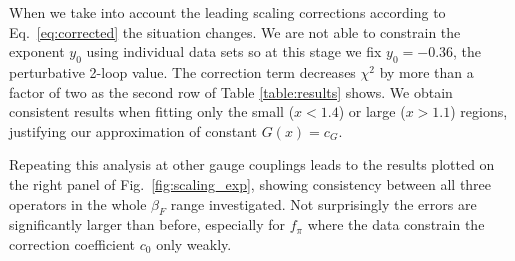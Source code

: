 \documentclass[aps,prl,twocolumn,]{revtex4-1}  %
\newcommand{\eq}[1]{Eq.~\ref{#1}}
\newcommand{\fig}[1]{Fig.~\ref{#1}}
\begin{document}
When we take into account the leading scaling corrections according to \eq{eq:corrected} the situation changes. We are not able to constrain  the exponent $y_0$ using individual data sets so at this stage we fix $y_0=-0.36$, the perturbative  2-loop value. The correction term decreases  $\chi^2$ by more than a factor of two    as the second row of Table \ref{table:results} shows. We obtain consistent results when fitting only the small ($x<1.4$) or large ($x>1.1$) regions, justifying our approximation of constant $G(x) = c_G$. 

Repeating this analysis at other gauge couplings
leads to the results plotted on the right panel of \fig{fig:scaling_exp}, showing consistency between all three operators in the whole $\beta_F$ range investigated.
Not surprisingly the errors are significantly larger than before, especially for $f_\pi$ where the data constrain the correction coefficient $c_0$ only weakly.
\end{document}
